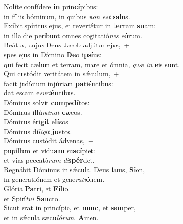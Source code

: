 \evenverse Nolíte confídere \textbf{in} prin\textbf{cí}pibus:~\*\\
\evenverse in fíliis hóminum, in quibus \textit{non} \textit{est} \textbf{sa}lus.\\
\oddverse Exíbit spíritus ejus, et revertétur in \textbf{ter}ram \textbf{su}am:~\*\\
\oddverse in illa die períbunt omnes cogitatió\textit{nes} \textit{e}\textbf{ó}rum.\\
\evenverse Beátus, cujus Deus Jacob adjútor ejus,~+\\
\evenverse  spes ejus in Dómino \textbf{De}o i\textbf{psí}us:~\*\\
\evenverse qui fecit cælum et terram, mare et ómnia, \textit{quæ} \textit{in} \textbf{e}is sunt.\\
\oddverse Qui custódit veritátem in sǽculum,~+\\
\oddverse  facit judícium injúriam \textbf{pa}ti\textbf{én}tibus:~\*\\
\oddverse dat escam e\textit{su}\textit{ri}\textbf{én}tibus.\\
\evenverse Dóminus solvit \textbf{com}pe\textbf{dí}tos:~\*\\
\evenverse Dóminus illú\textit{mi}\textit{nat} \textbf{cæ}cos.\\
\oddverse Dóminus éri\textbf{git} e\textbf{lí}sos:~\*\\
\oddverse Dóminus dí\textit{li}\textit{git} \textbf{ju}stos.\\
\evenverse Dóminus custódit ádvenas,~+\\
\evenverse  pupíllum et vídu\textbf{am} su\textbf{scí}piet:~\*\\
\evenverse et vias peccató\textit{rum} \textit{di}\textbf{spér}det.\\
\oddverse Regnábit Dóminus in sǽcula, Deus \textbf{tu}us, \textbf{Si}on,~\*\\
\oddverse in generatiónem et gene\textit{ra}\textit{ti}\textbf{ó}nem.\\
\evenverse Glória \textbf{Pa}tri, et \textbf{Fí}lio,~\*\\
\evenverse et Spirí\textit{tu}\textit{i} \textbf{San}cto.\\
\oddverse Sicut erat in princípio, et \textbf{nunc}, et \textbf{sem}per,~\*\\
\oddverse et in sǽcula sæcu\textit{ló}\textit{rum}. \textbf{A}men.\\
